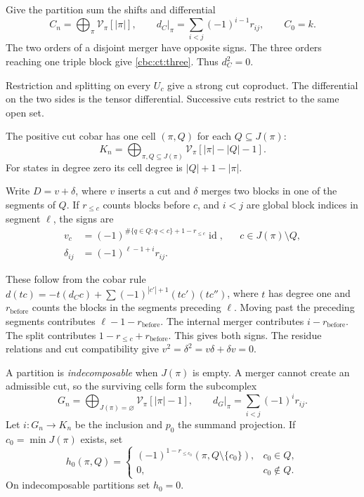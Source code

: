 Give the partition sum the shifts and differential
\begin{equation}\label{cbc:ct:coalgebra}
 C_n=\bigoplus_\pi\mathcal V_\pi[|\pi|],\qquad
 d_C|_\pi=\sum_{i<j}(-1)^{i-1}r_{ij},\qquad C_0=k.
\end{equation}
The two orders of a disjoint merger have opposite signs. The
three orders reaching one triple block give
\eqref{cbc:ct:three}. Thus $d_C^2=0$.

Restriction and splitting
on every $U_c$ give a strong cut coproduct. The differential on
the two sides is the tensor differential. Successive cuts
restrict to the same open set.

The positive cut cobar has one cell $(\pi,Q)$ for each
$Q\subseteq J(\pi)$:
\begin{equation}\label{cbc:ct:cells}
 K_n=\bigoplus_{\pi,Q\subseteq J(\pi)}
       \mathcal V_\pi[|\pi|-|Q|-1].
\end{equation}
For states in degree zero its cell degree is $|Q|+1-|\pi|$.

Write $D=v+\delta$, where $v$ inserts a cut and $\delta$
merges two blocks in one of the segments of $Q$. If $r_{\leq c}$
counts blocks before $c$, and $i<j$ are global block indices in
segment $\ell$, the signs are
\begin{align}
 v_c&=(-1)^{\#\{q\in Q:q<c\}+1-r_{\leq c}}\operatorname{id},
                    &&c\in J(\pi)\setminus Q,
                    \label{cbc:ct:cut-sign}\\
 \delta_{ij}&=(-1)^{\ell-1+i}r_{ij}.
                    \label{cbc:ct:merge-sign}
\end{align}

These follow from the cobar rule
$d(tc)=-t(d_Cc)+\sum(-1)^{|c'|+1}(tc')(tc'')$,
where $t$ has degree one and $r_{\mathrm{before}}$ counts
the blocks in the segments preceding $\ell$.
Moving past the preceding segments
contributes $\ell-1-r_{\mathrm{before}}$. The internal merger
contributes $i-r_{\mathrm{before}}$. The split contributes
$1-r_{\leq c}+r_{\mathrm{before}}$. This gives both signs.
The residue relations and cut compatibility give
$v^2=\delta^2=v\delta+\delta v=0$.

A partition is \emph{indecomposable} when $J(\pi)$ is empty.
A merger cannot create an admissible cut, so the surviving cells
form the subcomplex
\begin{equation}\label{cbc:ct:survivors}
 G_n=\bigoplus_{J(\pi)=\varnothing}\mathcal V_\pi[|\pi|-1],
       \qquad d_G|_\pi=\sum_{i<j}(-1)^ir_{ij}.
\end{equation}
Let $i:G_n\to K_n$ be the inclusion and $p_0$ the summand
projection. If $c_0=\min J(\pi)$ exists, set
\begin{equation}\label{cbc:ct:first-cut}
 h_0(\pi,Q)=
 \begin{cases}
  (-1)^{1-r_{\leq c_0}}(\pi,Q\setminus\{c_0\}),&c_0\in Q,\\
  0,&c_0\notin Q.
 \end{cases}
\end{equation}
On indecomposable partitions set $h_0=0$.

